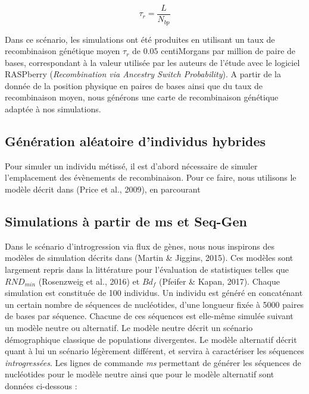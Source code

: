 \documentclass[12pt,twoside]{ugathesis}
\begin{document}
\[\tau_r = \frac{L}{N_{bp}}\]

Dans ce scénario, les simulations ont été produites en utilisant un taux
de recombinaison génétique moyen \(\tau_r\) de \(0.05\) centiMorgans par
million de paire de bases, correspondant à la valeur utilisée par les
auteurs de l'étude avec le logiciel RASPberry
(\textit{Recombination via Ancestry Switch Probability}). A partir de la
donnée de la position physique en paires de bases ainsi que du taux de
recombinaison moyen, nous générons une carte de recombinaison génétique
adaptée à nos simulations.

\subsection{Génération aléatoire d'individus
hybrides}\label{generation-aleatoire-dindividus-hybrides}

Pour simuler un individu métissé, il est d'abord nécessaire de simuler
l'emplacement des évènements de recombinaison. Pour ce faire, nous
utilisons le modèle décrit dans (Price et al., 2009), en parcourant

\newpage

\subsection{Simulations à partir de ms et
Seq-Gen}\label{simulations-a-partir-de-ms-et-seq-gen}

Dans le scénario d'introgression via flux de gènes, nous nous inspirons
des modèles de simulation décrits dans (Martin \& Jiggins, 2015). Ces
modèles sont largement repris dans la littérature pour l'évaluation de
statistiques telles que \(RND_{min}\) (Rosenzweig et al., 2016) et
\(Bd_f\) (Pfeifer \& Kapan, 2017). Chaque simulation est constituée de
100 individus. Un individu est généré en concaténant un certain nombre
de séquences de nucléotides, d'une longueur fixée à 5000 paires de bases
par séquence. Chacune de ces séquences est elle-même simulée suivant un
modèle neutre ou alternatif. Le modèle neutre décrit un scénario
démographique classique de populations divergentes. Le modèle alternatif
décrit quant à lui un scénario légèrement différent, et servira à
caractériser les séquences \emph{introgressées}. Les lignes de commande
\emph{ms} permettant de générer les séquences de nucléotides pour le
modèle neutre ainsi que pour le modèle alternatif sont données
ci-dessous :
\end{document}
